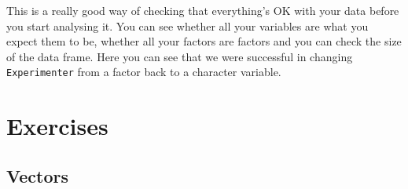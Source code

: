 \documentclass[
]{book}
\newenvironment{Shaded}{\begin{snugshade}}{\end{snugshade}}
\newcommand{\DecValTok}[1]{\textcolor[rgb]{0.00,0.00,0.81}{#1}}
\newcommand{\ErrorTok}[1]{\textcolor[rgb]{0.64,0.00,0.00}{\textbf{#1}}}
\newcommand{\KeywordTok}[1]{\textcolor[rgb]{0.13,0.29,0.53}{\textbf{#1}}}
\newcommand{\NormalTok}[1]{#1}
\newcommand{\OperatorTok}[1]{\textcolor[rgb]{0.81,0.36,0.00}{\textbf{#1}}}
\newcommand{\StringTok}[1]{\textcolor[rgb]{0.31,0.60,0.02}{#1}}
\begin{document}
\begin{Shaded}
\end{Shaded}

This is a really good way of checking that everything's OK with your data before you start analysing it. You can see whether all your variables are what you expect them to be, whether all your factors are factors and you can check the size of the data frame. Here you can see that we were successful in changing \texttt{Experimenter} from a factor back to a character variable.

\hypertarget{exercises-1}{%
\section{Exercises}\label{exercises-1}}

\hypertarget{vectors-1}{%
\subsection{Vectors}\label{vectors-1}}
\end{document}

